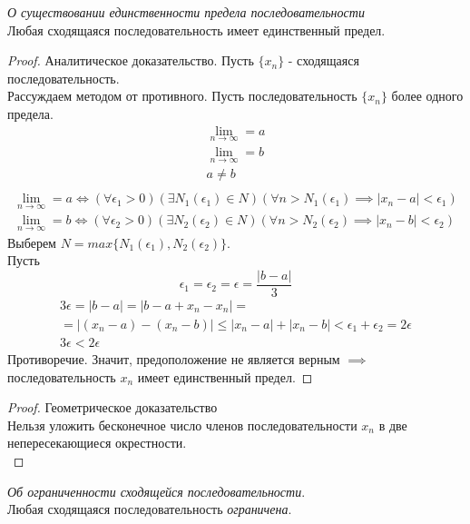 \begin{theorem}
  \textit{О существовании единственности предела последовательности} \\
  Любая сходящаяся последовательность имеет единственный предел.
\end{theorem}
\begin{proof} Аналитическое доказательство.
  Пусть $\{x_{n}\} $ - сходящаяся последовательность. \\
  Рассуждаем методом от противного. Пусть последовательность $\{x_{n}\} $ более одного предела.
  \begin{gather*}
    \lim_{n \to \infty} = a \\
    \lim_{n \to \infty} = b \\
    a \neq b \\
  \end{gather*}
  \begin{gather}
    \lim_{n \to \infty} = a \iff (\forall \epsilon_1 > 0)(\exists N_1(\epsilon_1) \in N)(\forall n > N_1(\epsilon_1) \implies |x_{n} - a| < \epsilon_1) \\
    \lim_{n \to \infty} = b \iff (\forall \epsilon_2 > 0)(\exists N_2(\epsilon_2) \in N)(\forall n > N_2(\epsilon_2) \implies |x_{n} - b| < \epsilon_2)  
  \end{gather} 
  Выберем $N=max \{N_1\left( \epsilon_1 \right) , N_2\left( \epsilon_2 \right) \}$. \\
  Пусть 
  \[
    \epsilon_1 = \epsilon_2 = \epsilon = \frac{|b - a|}{3}
  \]
  \begin{gather*}
  3 \epsilon = |b - a| = |b - a + x_{n} - x_{n}| = \\
  = |(x_{n} - a) - (x_{n} - b)| \le |x_{n} - a| + |x_{n} - b| < \epsilon_1 + \epsilon_2 = 2 \epsilon \\
  3 \epsilon < 2 \epsilon
  \end{gather*}
  Противоречие. Значит, предоположение не является верным $\implies$ последовательность $x_{n}$ имеет единственный предел.
\end{proof}

\begin{proof} Геометрическое доказательство\\
  Нельзя уложить бесконечное число членов последовательности $x_{n}$ в две непересекающиеся окрестности. \\
\end{proof}

\begin{theorem}
  \textit{Об ограниченности сходящейся последовательности}. \\ 
  Любая сходящаяся последовательность \textit{ограничена}. 
\end{theorem}


